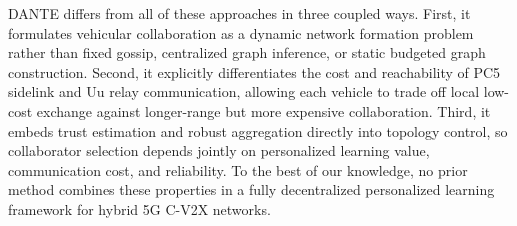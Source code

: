 DANTE differs from all of these approaches in three coupled ways. First, it formulates vehicular collaboration as a dynamic network formation problem rather than fixed gossip, centralized graph inference, or static budgeted graph construction. Second, it explicitly differentiates the cost and reachability of PC5 sidelink and Uu relay communication, allowing each vehicle to trade off local low-cost exchange against longer-range but more expensive collaboration. Third, it embeds trust estimation and robust aggregation directly into topology control, so collaborator selection depends jointly on personalized learning value, communication cost, and reliability. To the best of our knowledge, no prior method combines these properties in a fully decentralized personalized learning framework for hybrid 5G C-V2X networks.


